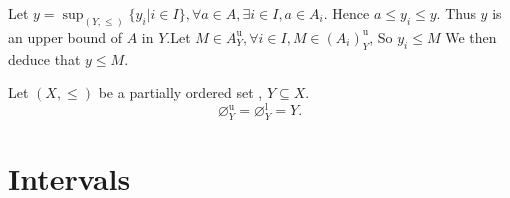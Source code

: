 \documentclass{book}
\numberwithin{equation}{section}
\begin{document}
\begin{proofenv}
    Let $y=\sup_{(Y, \le)}\{y_i|i\in I\}, \forall a\in A , \exists i\in I, a\in A_i$. Hence $a\le y_i\le y$. Thus $y $ is an upper bound of $A$ in $Y$.Let $M\in A_Y^\mathrm{u}, \forall i \in I, M\in (A_i)_Y^\mathrm{u}$,  So $y_i \le M $ We then deduce that $y\le M$.
\end{proofenv}
\begin{propositionenv}
    Let $(X, \le)$ be a partially ordered set , $Y\subseteq X$.$$\varnothing_Y^\mathrm{u}=\varnothing_Y^\mathrm{l}=Y.$$
\end{propositionenv}


\section{Intervals}
\end{document}
